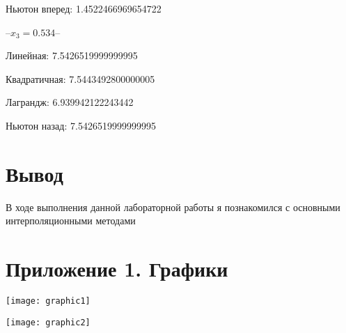 \documentclass[12pt, a4paper]{article}
\begin{document}
Ньютон вперед: 1.4522466969654722

--$x_3 = 0.534$--

Линейная: 7.5426519999999995

Квадратичная: 7.5443492800000005

Лаграндж: 6.939942122243442

Ньютон назад: 7.5426519999999995

\section*{Вывод}

В ходе выполнения данной лабораторной работы я познакомился с основными
интерполяционными методами

\pagebreak

\section*{Приложение 1. Графики}

\texttt{[image: graphic1]}

\texttt{[image: graphic2]}
\end{document}
